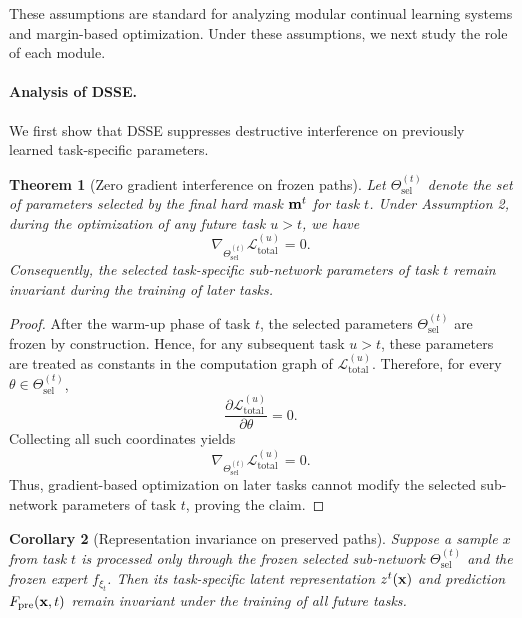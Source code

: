 \documentclass[journal]{IEEEtran}
\theoremstyle{plain}
\newtheorem{theorem}{Theorem}[section]
\newtheorem{corollary}[theorem]{Corollary}
\theoremstyle{definition}
\theoremstyle{remark}
\begin{document}
These assumptions are standard for analyzing modular continual learning systems and margin-based optimization. Under these assumptions, we next study the role of each module.

\paragraph{Analysis of DSSE.}
We first show that DSSE suppresses destructive interference on previously learned task-specific parameters.

\begin{theorem}[Zero gradient interference on frozen paths]
\label{thm:no-interference}
Let $\Theta^{(t)}_{\mathrm{sel}}$ denote the set of parameters selected by the final hard mask ${\bf m}^t$ for task $t$. Under Assumption 2, during the optimization of any future task $u>t$, we have
\begin{equation}
\nabla_{\Theta^{(t)}_{\mathrm{sel}}}\mathcal{L}^{(u)}_{\mathrm{total}}=0.
\label{eq:no-interference}
\end{equation}
Consequently, the selected task-specific sub-network parameters of task $t$ remain invariant during the training of later tasks.
\end{theorem}

\begin{proof}
After the warm-up phase of task $t$, the selected parameters $\Theta^{(t)}_{\mathrm{sel}}$ are frozen by construction. Hence, for any subsequent task $u>t$, these parameters are treated as constants in the computation graph of $\mathcal{L}^{(u)}_{\mathrm{total}}$. Therefore, for every $\theta\in \Theta^{(t)}_{\mathrm{sel}}$,
\begin{equation}
\frac{\partial \mathcal{L}^{(u)}_{\mathrm{total}}}{\partial \theta}=0.
\end{equation}
Collecting all such coordinates yields
\begin{equation}
\nabla_{\Theta^{(t)}_{\mathrm{sel}}}\mathcal{L}^{(u)}_{\mathrm{total}}=0.
\end{equation}
Thus, gradient-based optimization on later tasks cannot modify the selected sub-network parameters of task $t$, proving the claim.
\end{proof}

\begin{corollary}[Representation invariance on preserved paths]
\label{cor:representation-invariance}
Suppose a sample $x$ from task $t$ is processed only through the frozen selected sub-network $\Theta^{(t)}_{\mathrm{sel}}$ and the frozen expert $f_{\xi_t}$. Then its task-specific latent representation $z^{t}({\bf x})$ and prediction $F_{\mathrm{pre}}({\bf x},t)$ remain invariant under the training of all future tasks.
\end{corollary}
\end{document}
